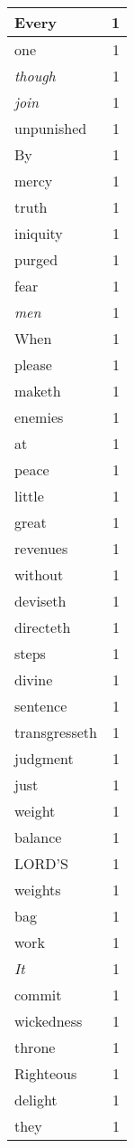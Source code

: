 \begin{center}
\begin{longtable}{l|r}
Every & 1\\ \hline 
one & 1\\ \hline 
\emph{though} & 1\\ \hline 
\emph{join} & 1\\ \hline 
unpunished & 1\\ \hline 
By & 1\\ \hline 
mercy & 1\\ \hline 
truth & 1\\ \hline 
iniquity & 1\\ \hline 
purged & 1\\ \hline 
fear & 1\\ \hline 
\emph{men} & 1\\ \hline 
When & 1\\ \hline 
please & 1\\ \hline 
maketh & 1\\ \hline 
enemies & 1\\ \hline 
at & 1\\ \hline 
peace & 1\\ \hline 
little & 1\\ \hline 
great & 1\\ \hline 
revenues & 1\\ \hline 
without & 1\\ \hline 
deviseth & 1\\ \hline 
directeth & 1\\ \hline 
steps & 1\\ \hline 
divine & 1\\ \hline 
sentence & 1\\ \hline 
transgresseth & 1\\ \hline 
judgment & 1\\ \hline 
just & 1\\ \hline 
weight & 1\\ \hline 
balance & 1\\ \hline 
LORD'S & 1\\ \hline 
weights & 1\\ \hline 
bag & 1\\ \hline 
work & 1\\ \hline 
\emph{It} & 1\\ \hline 
commit & 1\\ \hline 
wickedness & 1\\ \hline 
throne & 1\\ \hline 
Righteous & 1\\ \hline 
delight & 1\\ \hline 
they & 1\\ \hline 

\end{longtable}
\end{center}
